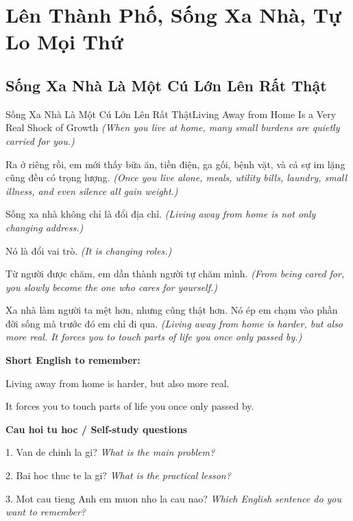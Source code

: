 \chapter{Lên Thành Phố, Sống Xa Nhà, Tự Lo Mọi Thứ}

\section{Sống Xa Nhà Là Một Cú Lớn Lên Rất Thật}
\begin{truyen}{Sống Xa Nhà Là Một Cú Lớn Lên Rất Thật}{Living Away from Home Is a Very Real Shock of Growth}
\textit{(When you live at home, many small burdens are quietly carried for you.)}

Ra ở riêng rồi, em mới thấy bữa ăn, tiền điện, ga gối, bệnh vặt, và cả sự im lặng cũng đều có trọng lượng.
\textit{(Once you live alone, meals, utility bills, laundry, small illness, and even silence all gain weight.)}

Sống xa nhà không chỉ là đổi địa chỉ.
\textit{(Living away from home is not only changing address.)}

Nó là đổi vai trò.
\textit{(It is changing roles.)}

Từ người được chăm, em dần thành người tự chăm mình.
\textit{(From being cared for, you slowly become the one who cares for yourself.)}

\end{truyen}

\begin{baihoc}
Xa nhà làm người ta mệt hơn, nhưng cũng thật hơn. Nó ép em chạm vào phần đời sống mà trước đó em chỉ đi qua.
\textit{(Living away from home is harder, but also more real. It forces you to touch parts of life you once only passed by.)}
\end{baihoc}

\begin{ghinhoanh}
\textbf{Short English to remember:}

Living away from home is harder, but also more real.

It forces you to touch parts of life you once only passed by.

\end{ghinhoanh}

\begin{tuhocnhanh}
\textbf{Cau hoi tu hoc / Self-study questions}

1. Van de chinh la gi? \textit{What is the main problem?}

2. Bai hoc thuc te la gi? \textit{What is the practical lesson?}

3. Mot cau tieng Anh em muon nho la cau nao? \textit{Which English sentence do you want to remember?}
\end{tuhocnhanh}
\ngancach

